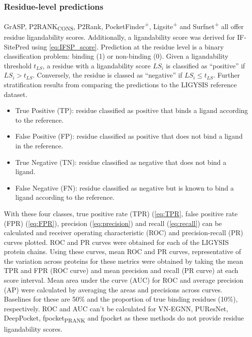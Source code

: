 \subsubsection{Residue-level predictions}

GrASP, P2RANK\textsubscript{CONS}, P2Rank, PocketFinder\textsuperscript{+}, Ligsite\textsuperscript{+} and Surfnet\textsuperscript{+} all offer residue ligandability scores. Additionally, a ligandability score was derived for IF-SitePred using \autoref{eq:IFSP_score}. Prediction at the residue level is a binary classification problem: binding (1) or non-binding (0). Given a ligandability threshold $t_{LS}$, a residue with a ligandability score $LS_{i}$ is classified as ``positive'' if $LS_{i} > t_{LS}$. Conversely, the residue is classed as ``negative'' if $LS_{i} \leq t_{LS}$. Further stratification results from comparing the predictions to the LIGYSIS reference dataset.

\begin{itemize}
\item True Positive (TP): residue classified as positive that binds a ligand according to the reference.
\item False Positive (FP): residue classified as positive that does not bind a ligand in the reference.
\item True Negative (TN): residue classified as negative that does not bind a ligand.
\item False Negative (FN): residue classified as negative but is known to bind a ligand according to the reference.
\end{itemize}

With these four classes, true positive rate (TPR) (\autoref{eq:TPR}, false positive rate (FPR) (\autoref{eq:FPR}), precision (\autoref{eq:precision}) and recall (\autoref{eq:recall}) can be calculated and receiver operating characteristic (ROC) and precision-recall (PR) curves plotted. ROC and PR curves were obtained for each of the LIGYSIS protein chains. Using these curves, mean ROC and PR curves, representative of the variation across proteins for these metrics were obtained by taking the mean TPR and FPR (ROC curve) and mean precision and recall (PR curve) at each score interval. Mean area under the curve (AUC) for ROC and average precision (AP) were calculated by averaging the areas and precisions across curves. Baselines for these are 50\% and the proportion of true binding residues (10\%), respectively. ROC and AUC can't be calculated for VN-EGNN, PUResNet, DeepPocket, fpocket\textsubscript{PRANK} and fpocket as these methods do not provide residue ligandability scores.

